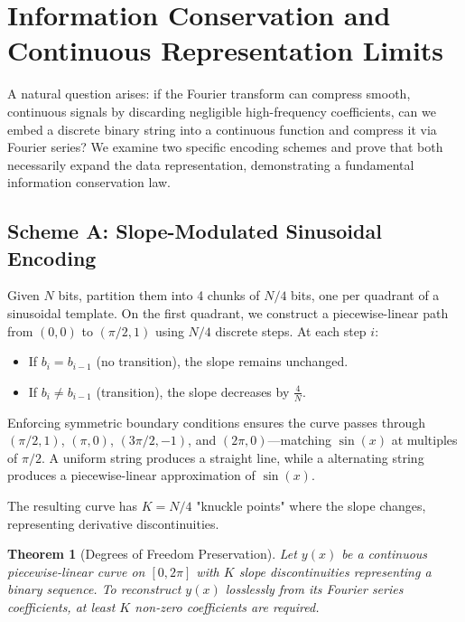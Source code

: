 \documentclass[11pt,twoside]{article}
\newtheorem{theorem}{Theorem}
\begin{document}
\section{Information Conservation and Continuous Representation Limits}

A natural question arises: if the Fourier transform can compress smooth, continuous signals by discarding negligible high-frequency coefficients, can we embed a discrete binary string into a continuous function and compress it via Fourier series? We examine two specific encoding schemes and prove that both necessarily expand the data representation, demonstrating a fundamental information conservation law.

\subsection{Scheme A: Slope-Modulated Sinusoidal Encoding}

Given $N$ bits, partition them into 4 chunks of $N/4$ bits, one per quadrant of a sinusoidal template. On the first quadrant, we construct a piecewise-linear path from $(0, 0)$ to $(\pi/2, 1)$ using $N/4$ discrete steps. At each step $i$:
\begin{itemize}
	\item If $b_i = b_{i-1}$ (no transition), the slope remains unchanged.
	\item If $b_i \neq b_{i-1}$ (transition), the slope decreases by $\frac{4}{N}$.
\end{itemize}
Enforcing symmetric boundary conditions ensures the curve passes through $(\pi/2, 1)$, $(\pi, 0)$, $(3\pi/2, -1)$, and $(2\pi, 0)$---matching $\sin(x)$ at multiples of $\pi/2$. A uniform string produces a straight line, while a alternating string produces a piecewise-linear approximation of $\sin(x)$.

The resulting curve has $K = N/4$ "knuckle points" where the slope changes, representing derivative discontinuities. 

\begin{theorem}[Degrees of Freedom Preservation]
	Let $y(x)$ be a continuous piecewise-linear curve on $[0, 2\pi]$ with $K$ slope discontinuities representing a binary sequence. To reconstruct $y(x)$ losslessly from its Fourier series coefficients, at least $K$ non-zero coefficients are required.
\end{theorem}
\end{document}
